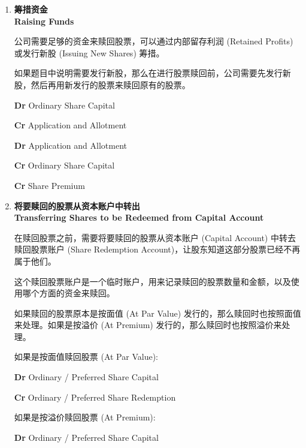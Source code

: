\documentclass{article}
\begin{document}
\begin{enumerate}
    \item \textbf{筹措资金\\Raising Funds}
    
    公司需要足够的资金来赎回股票，可以通过内部留存利润 (Retained Profits) 或发行新股 (Issuing New Shares) 筹措。

    如果题目中说明需要发行新股，那么在进行股票赎回前，公司需要先发行新股，然后再用新发行的股票来赎回原有的股票。

    \begin{mdframed}[backgroundcolor=gray!10]
    \textbf{Dr} Ordinary Share Capital

    \hspace{1.7em}\textbf{Cr} Application and Allotment

    \textbf{Dr} Application and Allotment

    \hspace{1.7em}\textbf{Cr} Ordinary Share Capital

    \hspace{1.7em}\textbf{Cr} Share Premium
    \end{mdframed}

    \item \textbf{将要赎回的股票从资本账户中转出\\Transferring Shares to be Redeemed from Capital Account}

    在赎回股票之前，需要将要赎回的股票从资本账户 (Capital Account) 中转去赎回股票账户 (Share Redemption Account)，让股东知道这部分股票已经不再属于他们。

    这个赎回股票账户是一个临时账户，用来记录赎回的股票数量和金额，以及使用哪个方面的资金来赎回。

    如果赎回的股票原本是按面值 (At Par Value) 发行的，那么赎回时也按照面值来处理。如果是按溢价 (At Premium) 发行的，那么赎回时也按照溢价来处理。

    如果是按面值赎回股票 (At Par Value):
    \begin{mdframed}[backgroundcolor=gray!10]
    \textbf{Dr} Ordinary / Preferred Share Capital

    \hspace{1.7em}\textbf{Cr} Ordinary / Preferred Share Redemption
    \end{mdframed}

    如果是按溢价赎回股票 (At Premium):
    \begin{mdframed}[backgroundcolor=gray!10]
    \textbf{Dr} Ordinary / Preferred Share Capital


\end{mdframed}
\end{enumerate}
\end{document}
